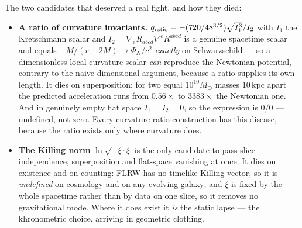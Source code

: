\documentclass[11pt,letterpaper]{article}
\begin{document}
The two candidates that deserved a real fight, and how they died:
\begin{itemize}\itemsep2pt
\item \textbf{A ratio of curvature invariants.} $q_{\rm ratio}=-(720/48^{3/2})\sqrt{I_1^3}/I_2$ with $I_1$ the Kretschmann scalar and $I_2=\nabla_eR_{abcd}\nabla^eR^{abcd}$ is a genuine spacetime scalar and equals $-M/(r-2M)\to\Phi_N/c^2$ \emph{exactly} on Schwarzschild --- so a dimensionless local curvature scalar \emph{can} reproduce the Newtonian potential, contrary to the naive dimensional argument, because a ratio supplies its own length. It dies on superposition: for two equal $10^{10}M_\odot$ masses $10$\,kpc apart the predicted acceleration runs from $0.56\times$ to $3383\times$ the Newtonian one. And in genuinely empty flat space $I_1=I_2=0$, so the expression is $0/0$ --- undefined, not zero. Every curvature-ratio construction has this disease, because the ratio exists only where curvature does.
\item \textbf{The Killing norm} $\ln\sqrt{-\xi\!\cdot\!\xi}$ is the only candidate to pass slice-independence, superposition and flat-space vanishing at once. It dies on existence and on counting: FLRW has no timelike Killing vector, so it is \emph{undefined} on cosmology and on any evolving galaxy; and $\xi$ is fixed by the whole spacetime rather than by data on one slice, so it removes no gravitational mode. Where it does exist it \emph{is} the static lapse --- the khronometric choice, arriving in geometric clothing.
\end{itemize}
\end{document}
